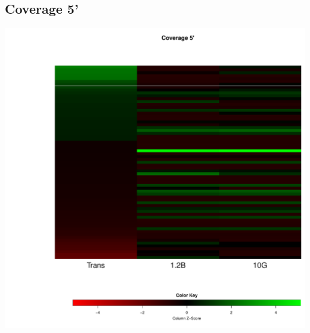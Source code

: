\documentclass{article}\usepackage[]{graphicx}\usepackage[]{color}
\newenvironment{knitrout}{}{} %
\begin{document}
\subsection{Coverage 5'}
\begin{knitrout}
\color{fgcolor}

{\centering \includegraphics[width=.9\linewidth]{figure/minimal-heat_cov_tss-1} 

}



\end{knitrout}
\clearpage
\clearpage
\end{document}
